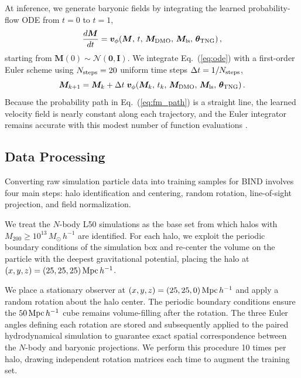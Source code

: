 \documentclass[linenumbers,trackchanges, twocolumn]{aastex701}
\begin{document}
At inference, we generate baryonic fields by integrating the learned
probability-flow ODE from $t=0$ to $t=1$,
\begin{equation}
    \frac{d\bm{M}}{dt}
    =
    \bm{v}_{\phi}\!\left(
        \bm{M},\,t,\,
        \bm{M}_{\rm DMO},\,\bm{M}_{\rm ls},\,\boldsymbol{\theta}_{\rm TNG}
    \right),
    \label{eq:ode}
\end{equation}
starting from $\bm{M}(0) \sim \mathcal{N}(\bm{0},\bm{I})$. We
integrate Eq.~(\ref{eq:ode}) with a first-order Euler scheme using
$N_{\rm steps}=20$ uniform time steps $\Delta t = 1/N_{\rm steps}$,
\begin{equation}
    \bm{M}_{k+1}
    =
    \bm{M}_{k}
    +
    \Delta t\;
    \bm{v}_{\phi}\!\left(
        \bm{M}_k,\,t_k,\,
        \bm{M}_{\rm DMO},\,\bm{M}_{\rm ls},\,\boldsymbol{\theta}_{\rm TNG}
    \right).
    \label{eq:euler}
\end{equation}
Because the probability path in Eq.~(\ref{eq:fm_path}) is a straight
line, the learned velocity field is nearly constant along each
trajectory, and the Euler integrator remains accurate with this modest
number of function evaluations \citep{lipman2023flowmatching}.


\subsection{Data Processing}
\label{subsec:data_processing}

Converting raw simulation particle data into training samples for
\textsc{BIND} involves four main steps: halo identification and
centering, random rotation, line-of-sight projection, and field
normalization.

We treat the $N$-body L50 simulations as the base set from which halos
with $M_{200} \geq 10^{13}\,M_{\odot}\,h^{-1}$ are identified. For
each halo, we exploit the periodic boundary conditions of the
simulation box and re-center the volume on the particle with the
deepest gravitational potential, placing the halo at
$(x,y,z) = (25,25,25)\,{\rm Mpc}\,h^{-1}$.

We place a stationary observer at $(x,y,z) = (25,25,0)\,{\rm
Mpc}\,h^{-1}$ and apply a random rotation about the halo center. The
periodic boundary conditions ensure the $50\,{\rm Mpc}\,h^{-1}$ cube
remains volume-filling after the rotation. The three Euler angles
defining each rotation are stored and subsequently applied to the
paired hydrodynamical simulation to guarantee exact spatial
correspondence between the $N$-body and baryonic projections. We
perform this procedure 10 times per halo, drawing independent rotation
matrices each time to augment the training set.
\end{document}
